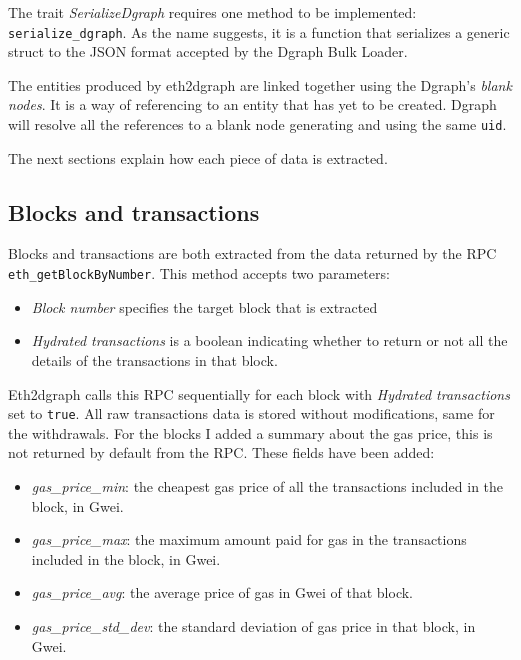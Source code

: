 The trait \textit{SerializeDgraph} requires one method to be implemented:\\ \texttt{serialize\_dgraph}. As the name suggests, it is a function that serializes a generic struct to the JSON format accepted by the Dgraph Bulk Loader.

The entities produced by eth2dgraph are linked together using the Dgraph's \textit{blank nodes}. It is a way of referencing to an entity that has yet to be created. Dgraph will resolve all the references to a blank node generating and using the same \texttt{uid}.

The next sections explain how each piece of data is extracted.

\subsection{Blocks and transactions}

Blocks and transactions are both extracted from the data returned by the RPC \texttt{eth\_getBlockByNumber}. 
This method accepts two parameters:

\begin{itemize}
    \item \textit{Block number} specifies the target block that is extracted
    \item \textit{Hydrated transactions} is a boolean indicating whether to return or not all the details of the transactions in that block.
\end{itemize}

Eth2dgraph calls this RPC sequentially for each block with \textit{Hydrated transactions} set to \texttt{true}. All raw transactions data is stored without modifications, same for the withdrawals. For the blocks I added a summary about the gas price, this is not returned by  default from the RPC. These fields have been added: 

\begin{itemize}
    \item \textit{gas\_price\_min}: the cheapest gas price of all the transactions included in the block, in Gwei.
    \item \textit{gas\_price\_max}: the maximum amount paid for gas in the transactions included in the block, in Gwei.
    \item \textit{gas\_price\_avg}: the average price of gas in Gwei of that block.
    \item \textit{gas\_price\_std\_dev}: the standard deviation of gas price in that block, in Gwei.
\end{itemize}

